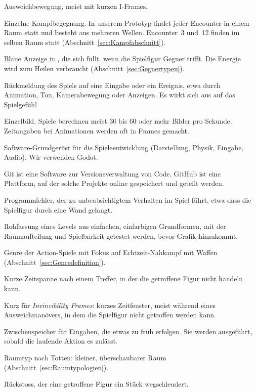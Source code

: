 \documentclass[../Main.tex]{subfiles}
\begin{document}
\begin{description}[style=unboxed, leftmargin=0cm, itemsep=0.3em]
\item[Dodge] Ausweichbewegung, meist mit kurzen I-Frames.
\item[Encounter] Einzelne Kampfbegegnung. In unserem Prototyp findet jeder Encounter in einem Raum statt und besteht aus mehreren Wellen. Encounter~3 und~12 finden im selben Raum statt (Abschnitt~\ref{sec:Kampfabschnitt}).
\item[Energieleiste] Blaue Anzeige in , die sich füllt, wenn die Spielfigur Gegner trifft. Die Energie wird zum Heilen verbraucht (Abschnitt~\ref{sec:Gegnertypen}).
\item[Feedback] Rückmeldung des Spiels auf eine Eingabe oder ein Ereignis, etwa durch Animation, Ton, Kamerabewegung oder Anzeigen. Es wirkt sich aus auf das Spielgefühl
\item[Frame] Einzelbild. Spiele berechnen meist 30 bis 60 oder mehr Bilder pro Sekunde. Zeitangaben bei Animationen werden oft in Frames gemacht.
\item[Game Engine] Software-Grundgerüst für die Spieleentwicklung (Darstellung, Physik, Eingabe, Audio). Wir verwenden Godot.
\item[Git, GitHub] Git ist eine Software zur Versionsverwaltung von Code. GitHub ist eine Plattform, auf der solche Projekte online gespeichert und geteilt werden.
\item[Glitch] Programmfehler, der zu unbeabsichtigtem Verhalten im Spiel führt, etwa dass die Spielfigur durch eine Wand gelangt.
\item[Greybox] Rohfassung eines Levels aus einfachen, einfarbigen Grundformen, mit der Raumaufteilung und Spielbarkeit getestet werden, bevor Grafik hinzukommt.
\item[Hack-and-Slash] Genre der Action-Spiele mit Fokus auf Echtzeit-Nahkampf mit Waffen (Abschnitt~\ref{sec:Genredefinition}).
\item[Hitstun] Kurze Zeitspanne nach einem Treffer, in der die getroffene Figur nicht handeln kann.
\item[I-Frames] Kurz für \textit{Invincibility Frames}: kurzes Zeitfenster, meist während eines Ausweichmanövers, in dem die Spielfigur nicht getroffen werden kann.
\item[Input-Buffer] Zwischenspeicher für Eingaben, die etwas zu früh erfolgen. Sie werden ausgeführt, sobald die laufende Aktion es zulässt.
\item[Intimate Space] Raumtyp nach Totten: kleiner, überschaubarer Raum (Abschnitt~\ref{sec:Raumtypologien}).
\item[Knockback] Rückstoss, der eine getroffene Figur ein Stück wegschleudert.

\end{description}
\end{document}
